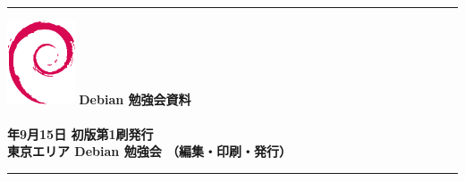 \documentclass[mingoth,a4paper]{jsarticle}
\newcommand{\debmtgyear}{2007}
\newcommand{\debmtgdate}{15}
\newcommand{\debmtgmonth}{9}
\begin{document}
\begin{minipage}[b]{0.2\hsize}
 \colorbox{dancerlightblue}{}
\end{minipage}
\begin{minipage}[b]{0.8\hsize}

\vspace*{15cm}
{\color{dancerlightblue}\rule{\hsize}{1mm}}
\vspace{2mm}
\includegraphics[width=2cm]{image200502/openlogo-nd.eps}
\noindent \Large \bf Debian 勉強会資料\\ \\
\noindent \normalfont \debmtgyear{}年\debmtgmonth{}月\debmtgdate{}日 \hspace{5mm}  初版第1刷発行\\
\noindent \normalfont 東京エリア Debian 勉強会 （編集・印刷・発行）\\
{\color{dancerdarkblue}\rule{\hsize}{1mm}}
\end{minipage}
\end{document}
